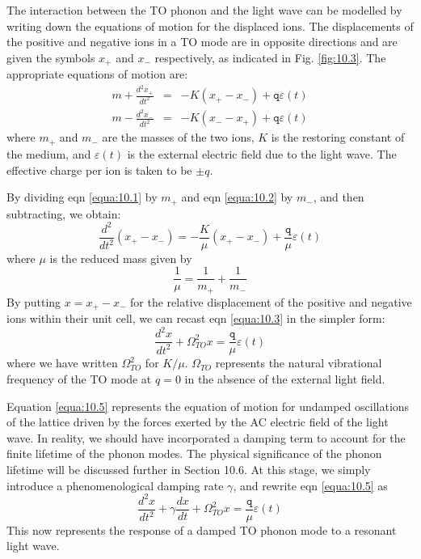 \documentclass[12pt]{book}
\begin{document}
The interaction between the TO phonon and the light wave can be modelled by writing down the equations of motion for the displaced ions. The displacements of the positive and negative ions in a TO mode are in opposite directions and are given the symbols $x_+$ and $x_-$ respectively, as indicated in Fig. \ref{fig:10.3}. The appropriate equations of motion are:
\begin{eqnarray}
  m+\frac{d^2x_+}{dt^2} &=& -K(x_+-x_-)+\texttt{q}\varepsilon(t) \label{equa:10.1} \\
  m-\frac{d^2x_-}{dt^2} &=& -K(x_--x_+)+\texttt{q}\varepsilon(t) \label{equa:10.2}
\end{eqnarray}
where $m_+$ and $m_-$ are the masses of the two ions, $K$ is the restoring constant of the medium, and $\varepsilon(t)$ is the external electric field due to the light wave. The effective charge per ion is taken to be $\pm q$.

By dividing eqn \ref{equa:10.1} by $m_+$ and eqn \ref{equa:10.2} by $m_-$, and then subtracting, we obtain:
\begin{equation}\label{equa:10.3}
  \frac{d^2}{dt^2}(x_+-x_-)=-\frac{K}{\mu}(x_+-x_-)+\frac{\texttt{q}}{\mu}\varepsilon(t)
\end{equation}
where $\mu$ is the reduced mass given by
\begin{equation}\label{equa:10.4}
  \frac{1}{\mu}=\frac{1}{m_+}+\frac{1}{m_-}
\end{equation}
By putting $x = x_+ - x_-$ for the relative displacement of the positive and negative ions within their unit cell, we can recast eqn \ref{equa:10.3} in the simpler form:
\begin{equation}\label{equa:10.5}
  \frac{d^2x}{dt^2}+\Omega_{TO}^2x=\frac{\texttt{q}}{\mu}\varepsilon(t)
\end{equation}
where we have written $\Omega_{TO}^2$ for $K/\mu$. $\Omega_{TO}$ represents the natural vibrational frequency of the TO mode at $q = 0$ in the absence of the external light field.

Equation \ref{equa:10.5} represents the equation of motion for undamped oscillations of the lattice driven by the forces exerted by the AC electric field of the light wave. In reality, we should have incorporated a damping term to account for the finite lifetime of the phonon modes. The physical significance of the phonon lifetime will be discussed further in Section 10.6. At this stage, we simply introduce a phenomenological damping rate $\gamma$, and rewrite eqn \ref{equa:10.5} as
\begin{equation}\label{equa:10.6}
  \frac{d^2x}{dt^2}+\gamma\frac{dx}{dt}+\Omega_{TO}^2x=\frac{\texttt{q}}{\mu}\varepsilon(t)
\end{equation}
This now represents the response of a damped TO phonon mode to a resonant light wave.
\end{document}
